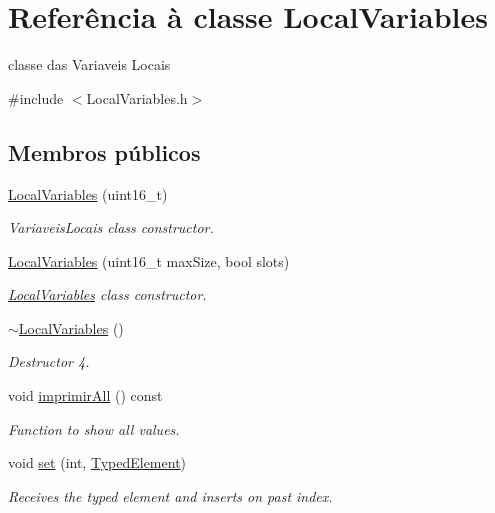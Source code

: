 \hypertarget{classLocalVariables}{}\section{Referência à classe Local\+Variables}
\label{classLocalVariables}


classe das Variaveis Locais  




{\ttfamily \#include $<$Local\+Variables.\+h$>$}

\subsection*{Membros públicos}
\begin{DoxyCompactItemize}
\item 
\hyperlink{classLocalVariables_ae354d02f996f4f584fe857d9304161c1}{Local\+Variables} (uint16\+\_\+t)
\begin{DoxyCompactList}\small\item\em Variaveis\+Locais class constructor. \end{DoxyCompactList}\item 
\hyperlink{classLocalVariables_a2c9e8aefc8aa8ff0d0efd305ab3e424b}{Local\+Variables} (uint16\+\_\+t max\+Size, bool slots)
\begin{DoxyCompactList}\small\item\em \hyperlink{classLocalVariables}{Local\+Variables} class constructor. \end{DoxyCompactList}\item 
\hyperlink{classLocalVariables_aaf00f6cc3391fdd2cc0ecd2b1d31c887}{$\sim$\+Local\+Variables} ()
\begin{DoxyCompactList}\small\item\em Destructor 4. \end{DoxyCompactList}\item 
void \hyperlink{classLocalVariables_a6f51e8532ae59a4eea6801872d5f8444}{imprimir\+All} () const
\begin{DoxyCompactList}\small\item\em Function to show all values. \end{DoxyCompactList}\item 
void \hyperlink{classLocalVariables_a6d79e0c874931e97ed68a25cf60ab119}{set} (int, \hyperlink{BasicTypes_8h_a97b332303b1262282599e6ede0637b82}{Typed\+Element})
\begin{DoxyCompactList}\small\item\em Receives the typed element and inserts on past index. \end{DoxyCompactList}\item 

\end{DoxyCompactItemize}
